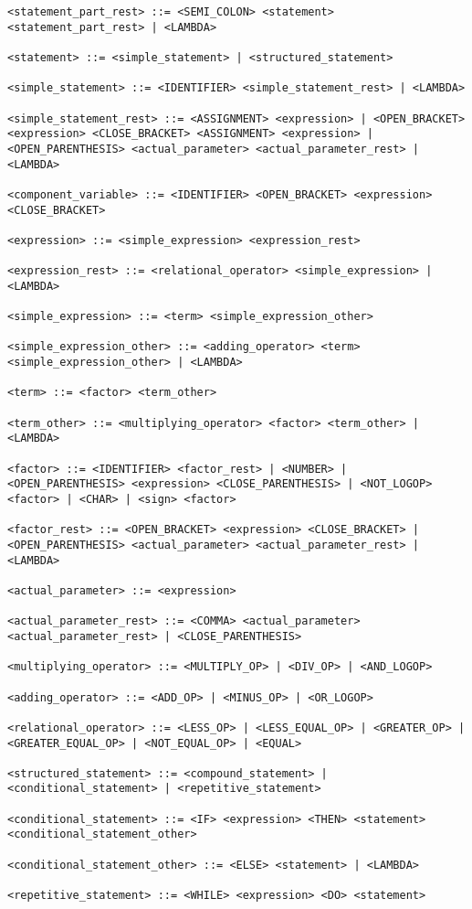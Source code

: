 \documentclass[a4paper,oneside]{report}
\begin{document}
\begin{verbatim}
<statement_part_rest> ::= <SEMI_COLON> <statement> <statement_part_rest> | <LAMBDA>

<statement> ::= <simple_statement> | <structured_statement>

<simple_statement> ::= <IDENTIFIER> <simple_statement_rest> | <LAMBDA>

<simple_statement_rest> ::= <ASSIGNMENT> <expression> | <OPEN_BRACKET> <expression> <CLOSE_BRACKET> <ASSIGNMENT> <expression> | <OPEN_PARENTHESIS> <actual_parameter> <actual_parameter_rest> | <LAMBDA>

<component_variable> ::= <IDENTIFIER> <OPEN_BRACKET> <expression> <CLOSE_BRACKET>

<expression> ::= <simple_expression> <expression_rest>

<expression_rest> ::= <relational_operator> <simple_expression> | <LAMBDA>

<simple_expression> ::= <term> <simple_expression_other> 

<simple_expression_other> ::= <adding_operator> <term> <simple_expression_other> | <LAMBDA>

<term> ::= <factor> <term_other>

<term_other> ::= <multiplying_operator> <factor> <term_other> | <LAMBDA>

<factor> ::= <IDENTIFIER> <factor_rest> | <NUMBER> | <OPEN_PARENTHESIS> <expression> <CLOSE_PARENTHESIS> | <NOT_LOGOP> <factor> | <CHAR> | <sign> <factor>

<factor_rest> ::= <OPEN_BRACKET> <expression> <CLOSE_BRACKET> | <OPEN_PARENTHESIS> <actual_parameter> <actual_parameter_rest> | <LAMBDA>

<actual_parameter> ::= <expression>

<actual_parameter_rest> ::= <COMMA> <actual_parameter> <actual_parameter_rest> | <CLOSE_PARENTHESIS>

<multiplying_operator> ::= <MULTIPLY_OP> | <DIV_OP> | <AND_LOGOP>

<adding_operator> ::= <ADD_OP> | <MINUS_OP> | <OR_LOGOP>

<relational_operator> ::= <LESS_OP> | <LESS_EQUAL_OP> | <GREATER_OP> | <GREATER_EQUAL_OP> | <NOT_EQUAL_OP> | <EQUAL>

<structured_statement> ::= <compound_statement> | <conditional_statement> | <repetitive_statement>

<conditional_statement> ::= <IF> <expression> <THEN> <statement> <conditional_statement_other>

<conditional_statement_other> ::= <ELSE> <statement> | <LAMBDA>

<repetitive_statement> ::= <WHILE> <expression> <DO> <statement>
\end{verbatim}
\end{document}
